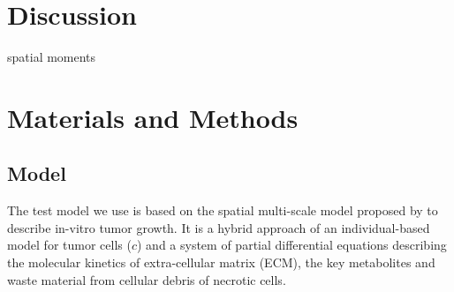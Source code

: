 \documentclass[10pt,letterpaper]{article}
\begin{document}


\section*{Discussion}


spatial moments


\section*{Materials and Methods}
\subsection*{Model}
The test model we use is based on the spatial multi-scale model proposed by \cite{Jagiella2015} to describe in-vitro tumor growth. It is a hybrid approach of an individual-based model for tumor cells ($c$) and a system of partial differential equations describing the molecular kinetics of extra-cellular matrix (ECM), the key metabolites and waste material from cellular debris of necrotic cells. 
\end{document}
